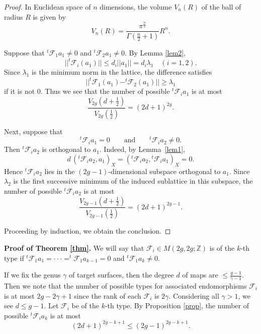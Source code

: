 \documentclass[11pt]{article}
\numberwithin{equation}{section}
\theoremstyle{plain}
\begin{document}
\begin{proof}
In Euclidean space of $n$ dimensions, the volume $V_n(R)$ of the ball of radius $R$ is given by
$$
V_n(R)=\frac{\pi^{\frac{n}{2}}}{\Gamma (\frac{n}{2}+1)}R^n .
$$

Suppose that $^{t}\mathcal{F}_{1}a_{1}\ne 0$ and $^{t}\mathcal{F}_{2}a_{1}\ne 0$.
By Lemma {\ref{lem2}}, 
$$||^{t}\mathcal{F}_i (a_1 )||\le d_i ||a_1 ||=d_i \lambda_1 \quad (i=1,2).
$$
Since $\lambda_1$ is the minimum norm in the lattice, the difference  satisfies
$$||^{t}\mathcal{F}_1 (a_1 )-^{t}\mathcal{F}_2 (a_1 )||\ge \lambda_1
$$ if it is not $0$.
Thus we see that the number of possible $^{t}\mathcal{F}_{i}a_{1}$
is at most 
$$
\frac{V_{2g} \left( d+\frac1{2} \right) }{V_{2g} \left( \frac1{2} \right)}
=(2d+1)^{2g}.
$$

Next, suppose that
$$
{}^{t}\mathcal{F}_{i}a_{1}=0
\qquad\text{and}\qquad
{}^{t}\mathcal{F}_{i}a_{2}\neq 0.
$$
Then
$
{}^{t}\mathcal{F}_{i}a_{2}
$
is orthogonal to \(a_{1}\). Indeed, by Lemma~\ref{lem1},
$$
d\,({}^{t}\mathcal{F}_{i}a_{2},a_{1})_X
=
({}^{t}\mathcal{F}_{i}a_{2},{}^{t}\mathcal{F}_{i}a_{1})_X
=
0.
$$
Hence
$
{}^{t}\mathcal{F}_{i}a_{2}
$
lies in the \((2g-1)\)-dimensional subspace orthogonal to $a_{1}$.
Since \(\lambda_{2}\) is the first successive minimum of the induced
sublattice in this subspace, 
the number of possible $^{t}\mathcal{F}_{i}a_{2}$
is at most 
$$
\frac{V_{2g-1} \left( d+\frac1{2} \right) }{V_{2g-1} \left( \frac1{2} \right)}
=(2d+1)^{2g-1}.
$$

Proceeding by induction, we obtain the conclusion.
\end{proof}



 \textbf{Proof of Theorem \ref{thm}.} 
 We will say that $\mathcal{F}_{i}\in M(2g,2g;\mathbb{Z})$ is of the $k$-th type if $^{t}\mathcal{F}_{1}a_{1}=\cdot\cdot\cdot=^{t}\mathcal{F}_{1}a_{k-1}= 0$ and $^{t}\mathcal{F}_{1}a_{k}\ne0$. 

 
 If we fix the genus $\gamma$ of target surfaces, then the degree $d$ of maps are $\le \frac{g-1}{\gamma-1}$.  Then we note that the number of possible types for associated endomorphisms $\mathcal{F}_{i}$ is at most $2g-2\gamma+1$ since the rank of each $\mathcal{F}_{i}$ is $2\gamma$.  
 Considering all $\gamma>1$, we see $d\leq g-1$.
 Let $\mathcal{F}_{i}$ be of the $k$-th type.  
 By Proposition \ref{prop},
  the number of possible $^{t}\mathcal{F}_{i}a_{k}$
is at most 
$$
(2d+1)^{2g-k+1}\leq (2g-1)^{2g-k+1}.
$$
  
\end{document}
